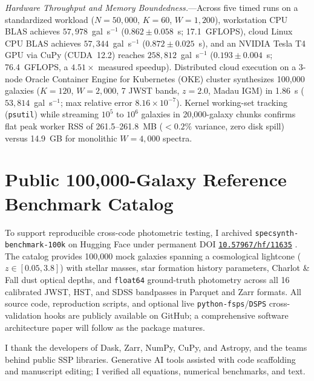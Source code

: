 \documentclass[RNAAS]{aastex7}
\begin{document}
\textit{Hardware Throughput and Memory Boundedness.}---Across five timed runs on a standardized workload ($N=50{,}000$, $K=60$, $W=1{,}200$), workstation CPU BLAS achieves $57{,}978$~gal~s$^{-1}$ ($0.862\pm 0.058$~s; 17.1~GFLOPS), cloud Linux CPU BLAS achieves $57{,}344$~gal~s$^{-1}$ ($0.872\pm 0.025$~s), and an NVIDIA Tesla T4 GPU via CuPy (CUDA~12.2) reaches $258{,}812$~gal~s$^{-1}$ ($0.193\pm 0.004$~s; 76.4~GFLOPS, a $4.51\times$ measured speedup). Distributed cloud execution on a 3-node Oracle Container Engine for Kubernetes (OKE) cluster synthesizes 100,000 galaxies ($K=120$, $W=2{,}000$, 7 JWST bands, $z=2.0$, Madau IGM) in 1.86~s ($53{,}814$~gal~s$^{-1}$; max relative error $8.16\times 10^{-7}$). Kernel working-set tracking (\texttt{psutil}) while streaming $10^5$ to $10^6$ galaxies in 20,000-galaxy chunks confirms flat peak worker RSS of 261.5--261.8~MB ($<0.2\%$ variance, zero disk spill) versus 14.9~GB for monolithic $W=4{,}000$ spectra.

\section{Public 100,000-Galaxy Reference Benchmark Catalog}

To support reproducible cross-code photometric testing, I archived \texttt{specsynth-benchmark-100k} on Hugging Face under permanent DOI \href{https://doi.org/10.57967/hf/11635}{\texttt{10.57967/hf/11635}} \citep{sankar_ganesh_bala_krishnan_2026}. The catalog provides 100,000 mock galaxies spanning a cosmological lightcone ($z\in[0.05, 3.8]$) with stellar masses, star formation history parameters, Charlot \& Fall dust optical depths, and \texttt{float64} ground-truth photometry across all 16 calibrated JWST, HST, and SDSS bandpasses in Parquet and Zarr formats. All source code, reproduction scripts, and optional live \texttt{python-fsps}/\texttt{DSPS} cross-validation hooks are publicly available on GitHub; a comprehensive software architecture paper will follow as the package matures.

\begin{acknowledgments}
I thank the developers of Dask, Zarr, NumPy, CuPy, and Astropy, and the teams behind public SSP libraries. Generative AI tools assisted with code scaffolding and manuscript editing; I verified all equations, numerical benchmarks, and text.
\end{acknowledgments}

{}

\end{document}
